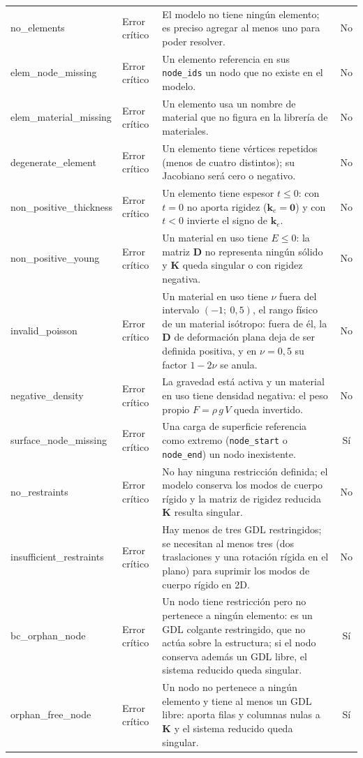 \begin{longtable}{@{}>{\ttfamily\footnotesize}p{2.8cm} >{\footnotesize}l >{\footnotesize\raggedright\arraybackslash}p{5.4cm} >{\footnotesize}c@{}}
no\_elements & Error crítico & El modelo no tiene ningún elemento; es preciso agregar al menos uno para poder resolver. & No \\
\addlinespace
elem\_node\_missing & Error crítico & Un elemento referencia en sus \texttt{node\_ids} un nodo que no existe en el modelo. & No \\
\addlinespace
elem\_material\_missing & Error crítico & Un elemento usa un nombre de material que no figura en la librería de materiales. & No \\
\addlinespace
degenerate\_element & Error crítico & Un elemento tiene vértices repetidos (menos de cuatro distintos); su Jacobiano será cero o negativo. & No \\
\addlinespace
non\_positive\_thickness & Error crítico & Un elemento tiene espesor $t \le 0$: con $t = 0$ no aporta rigidez ($\bm{k}_e = \bm{0}$) y con $t < 0$ invierte el signo de $\bm{k}_e$. & No \\
\addlinespace
non\_positive\_young & Error crítico & Un material en uso tiene $E \le 0$: la matriz $\bm{D}$ no representa ningún sólido y $\bm{K}$ queda singular o con rigidez negativa. & No \\
\addlinespace
invalid\_poisson & Error crítico & Un material en uso tiene $\nu$ fuera del intervalo $(-1;\ 0{,}5)$, el rango físico de un material isótropo: fuera de él, la $\bm{D}$ de deformación plana deja de ser definida positiva, y en $\nu = 0{,}5$ su factor $1-2\nu$ se anula. & No \\
\addlinespace
negative\_density & Error crítico & La gravedad está activa y un material en uso tiene densidad negativa: el peso propio $F = \rho\, g\, V$ queda invertido. & No \\
\addlinespace
surface\_node\_missing & Error crítico & Una carga de superficie referencia como extremo (\texttt{node\_start} o \texttt{node\_end}) un nodo inexistente. & Sí \\
\addlinespace
no\_restraints & Error crítico & No hay ninguna restricción definida; el modelo conserva los modos de cuerpo rígido y la matriz de rigidez reducida $\bm{K}$ resulta singular. & No \\
\addlinespace
insufficient\_restraints & Error crítico & Hay menos de tres GDL restringidos; se necesitan al menos tres (dos traslaciones y una rotación rígida en el plano) para suprimir los modos de cuerpo rígido en 2D. & No \\
\addlinespace
bc\_orphan\_node & Error crítico & Un nodo tiene restricción pero no pertenece a ningún elemento: es un GDL colgante restringido, que no actúa sobre la estructura; si el nodo conserva además un GDL libre, el sistema reducido queda singular. & Sí \\
\addlinespace
orphan\_free\_node & Error crítico & Un nodo no pertenece a ningún elemento y tiene al menos un GDL libre: aporta filas y columnas nulas a $\bm{K}$ y el sistema reducido queda singular. & Sí \\
\midrule


\end{longtable}

